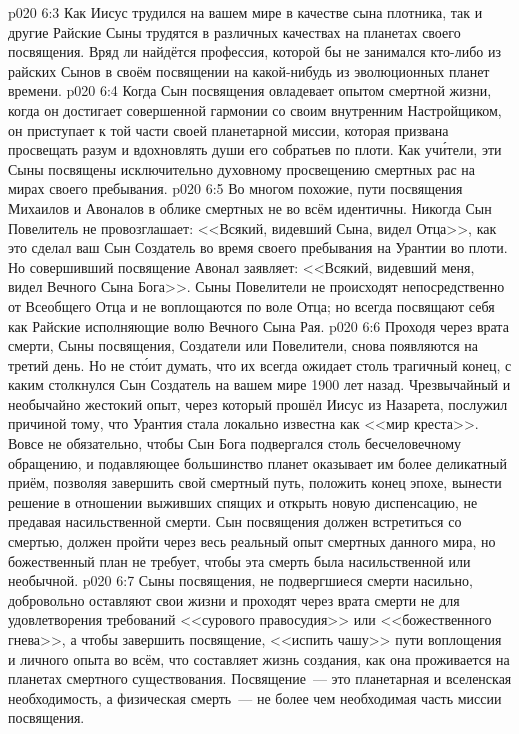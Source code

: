 \vs p020 6:3 Как Иисус трудился на вашем мире в качестве сына плотника, так и другие Райские Сыны трудятся в различных качествах на планетах своего посвящения. Вряд ли найдётся профессия, которой бы не занимался кто\hyp{}либо из райских Сынов в своём посвящении на какой\hyp{}нибудь из эволюционных планет времени.
\vs p020 6:4 Когда Сын посвящения овладевает опытом смертной жизни, когда он достигает совершенной гармонии со своим внутренним Настройщиком, он приступает к той части своей планетарной миссии, которая призвана просвещать разум и вдохновлять души его собратьев по плоти. Как уч\'ители, эти Сыны посвящены исключительно духовному просвещению смертных рас на мирах своего пребывания.
\vs p020 6:5 \pc Во многом похожие, пути посвящения Михаилов и Авоналов в облике смертных не во всём идентичны. Никогда Сын Повелитель не провозглашает: <<Всякий, видевший Сына, видел Отца>>, как это сделал ваш Сын Создатель во время своего пребывания на Урантии во плоти. Но совершивший посвящение Авонал заявляет: <<Всякий, видевший меня, видел Вечного Сына Бога>>. Сыны Повелители не происходят непосредственно от Всеобщего Отца и не воплощаются по воле Отца; но всегда посвящают себя как Райские  исполняющие волю Вечного Сына Рая.
\vs p020 6:6 \pc Проходя через врата смерти, Сыны посвящения, Создатели или Повелители, снова появляются на третий день. Но не ст\'оит думать, что их всегда ожидает столь трагичный конец, с каким столкнулся Сын Создатель на вашем мире 1900 лет назад. Чрезвычайный и необычайно жестокий опыт, через который прошёл Иисус из Назарета, послужил причиной тому, что Урантия стала локально известна как <<мир креста>>. Вовсе не обязательно, чтобы Сын Бога подвергался столь бесчеловечному обращению, и подавляющее большинство планет оказывает им более деликатный приём, позволяя завершить свой смертный путь, положить конец эпохе, вынести решение в отношении выживших спящих и открыть новую диспенсацию, не предавая насильственной смерти. Сын посвящения должен встретиться со смертью, должен пройти через весь реальный опыт смертных данного мира, но божественный план не требует, чтобы эта смерть была насильственной или необычной.
\vs p020 6:7 Сыны посвящения, не подвергшиеся смерти насильно, добровольно оставляют свои жизни и проходят через врата смерти не для удовлетворения требований <<сурового правосудия>> или <<божественного гнева>>, а чтобы завершить посвящение, <<испить чашу>> пути воплощения и личного опыта во всём, что составляет жизнь создания, как она проживается на планетах смертного существования. Посвящение~--- это планетарная и вселенская необходимость, а физическая смерть~--- не более чем необходимая часть миссии посвящения.
